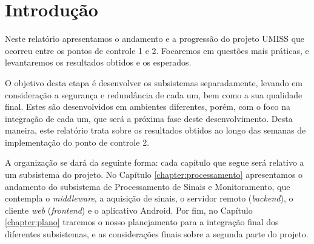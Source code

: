 \chapter{Introdução}

Neste relatório apresentamos o andamento e a progressão do projeto UMISS que
ocorreu entre os pontos de controle 1 e 2. Focaremos em questões mais práticas,
e levantaremos os resultados obtidos e os esperados.

O objetivo desta etapa é desenvolver os subsistemas separadamente, levando em
consideração a segurança e redundância de cada um, bem como a sua qualidade final.
Estes são desenvolvidos em ambientes diferentes, porém, com o foco na integração de cada
um, que será a próxima fase deste desenvolvimento. Desta maneira, este relatório
trata sobre os resultados obtidos ao longo das semanas de implementação
do ponto de controle 2.

A organização se dará da seguinte forma: cada capítulo que segue será relativo
a um subsistema do projeto. No Capítulo \ref{chapter:processamento}
apresentamos o andamento do subsistema de Processamento de Sinais e
Monitoramento, que contempla o \textit{middleware}, a aquisição de sinais, o
servidor remoto (\textit{backend}), o cliente \textit{web} (\textit{frontend})
e o aplicativo Android. Por fim, no Capítulo \ref{chapter:plano} traremos o
nosso planejamento para a integração final dos diferentes subsistemas, e
as considerações finais sobre a segunda parte do projeto.
